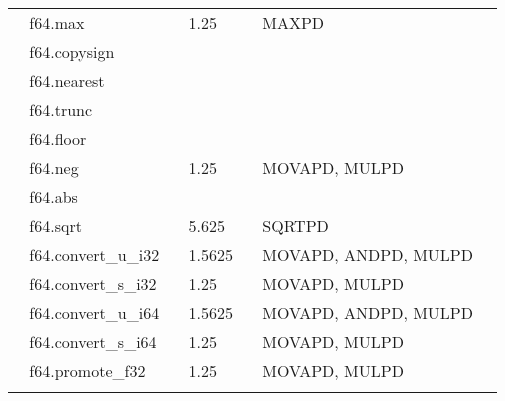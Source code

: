 \documentclass{article}
\begin{document}
\begin{table}
\begin{tabular}{|l|l|l|l|}
\multicolumn{1}{l}{~ f64.max}               & \multicolumn{1}{l}{~ 1.25}   & \multicolumn{1}{l}{~ MAXPD}                          & \multicolumn{1}{l}{}  \\
\multicolumn{1}{l}{~ f64.copysign}          & \multicolumn{1}{l}{}         & \multicolumn{1}{l}{}                                 & \multicolumn{1}{l}{}  \\
\multicolumn{1}{l}{~ f64.nearest}           & \multicolumn{1}{l}{}         & \multicolumn{1}{l}{}                                 & \multicolumn{1}{l}{}  \\
\multicolumn{1}{l}{~ f64.trunc}             & \multicolumn{1}{l}{}         & \multicolumn{1}{l}{}                                 & \multicolumn{1}{l}{}  \\
\multicolumn{1}{l}{~ f64.floor}             & \multicolumn{1}{l}{}         & \multicolumn{1}{l}{}                                 & \multicolumn{1}{l}{}  \\
\multicolumn{1}{l}{~ f64.neg}               & \multicolumn{1}{l}{~ 1.25}   & \multicolumn{1}{l}{~ MOVAPD, MULPD}                  & \multicolumn{1}{l}{}  \\
\multicolumn{1}{l}{~ f64.abs}               & \multicolumn{1}{l}{}         & \multicolumn{1}{l}{}                                 & \multicolumn{1}{l}{}  \\
\multicolumn{1}{l}{~ f64.sqrt}              & \multicolumn{1}{l}{~ 5.625}  & \multicolumn{1}{l}{~ SQRTPD}                         & \multicolumn{1}{l}{}  \\
\multicolumn{1}{l}{~ f64.convert\_u\_i32}   & \multicolumn{1}{l}{~ 1.5625} & \multicolumn{1}{l}{~ MOVAPD, ANDPD, MULPD}           & \multicolumn{1}{l}{}  \\
\multicolumn{1}{l}{~ f64.convert\_s\_i32}   & \multicolumn{1}{l}{~ 1.25}   & \multicolumn{1}{l}{~ MOVAPD, MULPD}                  & \multicolumn{1}{l}{}  \\
\multicolumn{1}{l}{~ f64.convert\_u\_i64}   & \multicolumn{1}{l}{~ 1.5625} & \multicolumn{1}{l}{~ MOVAPD, ANDPD, MULPD}           & \multicolumn{1}{l}{}  \\
\multicolumn{1}{l}{~ f64.convert\_s\_i64}   & \multicolumn{1}{l}{~ 1.25}   & \multicolumn{1}{l}{~ MOVAPD, MULPD}                  & \multicolumn{1}{l}{}  \\
\multicolumn{1}{l}{~ f64.promote\_f32}      & \multicolumn{1}{l}{~ 1.25}   & \multicolumn{1}{l}{~ MOVAPD, MULPD}                  & \multicolumn{1}{l}{}  \\
\multicolumn{1}{l}{}                        & \multicolumn{1}{l}{}         & \multicolumn{1}{l}{}                                 & \multicolumn{1}{l}{}  \\

\end{tabular}
\end{table}
\end{document}
